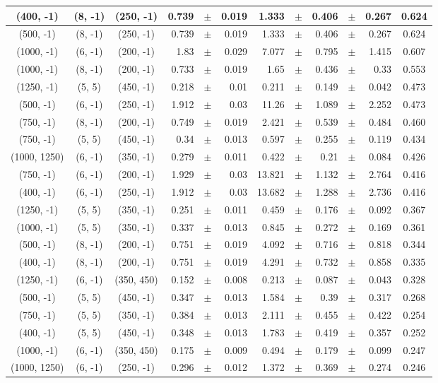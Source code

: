 \documentclass[12pt]{paper}
\begin{document}
\begin{table}[ht]
\begin{center}
{\begin{tabular}{|c|c|c|rrr|rrrrr|c|}
(400, -1)&(8, -1)&(250, -1)&0.739&$\pm$&0.019&1.333&$\pm$&0.406&$\pm$&0.267&0.624\\\hline
(500, -1)&(8, -1)&(250, -1)&0.739&$\pm$&0.019&1.333&$\pm$&0.406&$\pm$&0.267&0.624\\\hline
(1000, -1)&(6, -1)&(200, -1)&1.83&$\pm$&0.029&7.077&$\pm$&0.795&$\pm$&1.415&0.607\\\hline
(1000, -1)&(8, -1)&(200, -1)&0.733&$\pm$&0.019&1.65&$\pm$&0.436&$\pm$&0.33&0.553\\\hline
(1250, -1)&(5, 5)&(450, -1)&0.218&$\pm$&0.01&0.211&$\pm$&0.149&$\pm$&0.042&0.473\\\hline
(500, -1)&(6, -1)&(250, -1)&1.912&$\pm$&0.03&11.26&$\pm$&1.089&$\pm$&2.252&0.473\\\hline
(750, -1)&(8, -1)&(200, -1)&0.749&$\pm$&0.019&2.421&$\pm$&0.539&$\pm$&0.484&0.460\\\hline
(750, -1)&(5, 5)&(450, -1)&0.34&$\pm$&0.013&0.597&$\pm$&0.255&$\pm$&0.119&0.434\\\hline
(1000, 1250)&(6, -1)&(350, -1)&0.279&$\pm$&0.011&0.422&$\pm$&0.21&$\pm$&0.084&0.426\\\hline
(750, -1)&(6, -1)&(200, -1)&1.929&$\pm$&0.03&13.821&$\pm$&1.132&$\pm$&2.764&0.416\\\hline
(400, -1)&(6, -1)&(250, -1)&1.912&$\pm$&0.03&13.682&$\pm$&1.288&$\pm$&2.736&0.416\\\hline
(1250, -1)&(5, 5)&(350, -1)&0.251&$\pm$&0.011&0.459&$\pm$&0.176&$\pm$&0.092&0.367\\\hline
(1000, -1)&(5, 5)&(350, -1)&0.337&$\pm$&0.013&0.845&$\pm$&0.272&$\pm$&0.169&0.361\\\hline
(500, -1)&(8, -1)&(200, -1)&0.751&$\pm$&0.019&4.092&$\pm$&0.716&$\pm$&0.818&0.344\\\hline
(400, -1)&(8, -1)&(200, -1)&0.751&$\pm$&0.019&4.291&$\pm$&0.732&$\pm$&0.858&0.335\\\hline
(1250, -1)&(6, -1)&(350, 450)&0.152&$\pm$&0.008&0.213&$\pm$&0.087&$\pm$&0.043&0.328\\\hline
(500, -1)&(5, 5)&(450, -1)&0.347&$\pm$&0.013&1.584&$\pm$&0.39&$\pm$&0.317&0.268\\\hline
(750, -1)&(5, 5)&(350, -1)&0.384&$\pm$&0.013&2.111&$\pm$&0.455&$\pm$&0.422&0.254\\\hline
(400, -1)&(5, 5)&(450, -1)&0.348&$\pm$&0.013&1.783&$\pm$&0.419&$\pm$&0.357&0.252\\\hline
(1000, -1)&(6, -1)&(350, 450)&0.175&$\pm$&0.009&0.494&$\pm$&0.179&$\pm$&0.099&0.247\\\hline
(1000, 1250)&(6, -1)&(250, -1)&0.296&$\pm$&0.012&1.372&$\pm$&0.369&$\pm$&0.274&0.246\\\hline

\end{tabular}}
\end{center}
\end{table}
\end{document}
